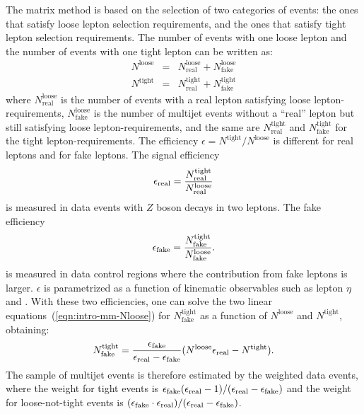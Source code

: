 The matrix method is based on the selection of two categories of
events: the ones that satisfy loose lepton selection requirements, and
the ones that satisfy tight lepton selection requirements.
The number of events with one loose lepton and
the number of events with one tight lepton can be written as:
%                                                                                             
\begin{eqnarray}
  N^\mathrm{loose}
  & = & N^\mathrm{loose}_\mathrm{real}
  + N^{\mathrm{loose}}_\mathrm{fake} \nonumber \\
  N^\mathrm{tight}
  & = & N^\mathrm{tight}_\mathrm{real}
  + N^{\mathrm{tight}}_\mathrm{fake}
  \label{eqn:intro-mm-Nloose}
\end{eqnarray}
%                                                                                             
where $N^\mathrm{loose}_\mathrm{real}$ is the number of events with a
real lepton satisfying loose lepton-requirements,
$N^\mathrm{loose}_\mathrm{fake}$ is the number of multijet events
without a ``real'' lepton but still satisfying loose
lepton-requirements, and the same are $N^\mathrm{tight}_\mathrm{real}$
and $N^\mathrm{tight}_\mathrm{fake}$ for the tight
lepton-requirements. The efficiency
$\epsilon=N^\mathrm{tight}/N^\mathrm{loose}$ is different for real
leptons and for fake leptons. The signal efficiency
%                                                                                             
\begin{equation}
  \epsilon_{\mathrm{real}}{}
  = \frac{N^\mathrm{tight}_\mathrm{real}}{N^\mathrm{loose}_\mathrm{real}}
\end{equation}
is measured in data events with $Z$ boson decays in two leptons.
The fake efficiency
\begin{equation}
  \epsilon_{\mathrm{fake}}{}
  = \frac{N^\mathrm{tight}_\mathrm{fake}}{N^\mathrm{loose}_\mathrm{fake}}.
  \label{eqn:intro-mm-real-fake}
\end{equation}
is measured in data control regions where the contribution from
fake leptons is larger. $\epsilon$ is parametrized as a
function of kinematic observables such as lepton $\eta$ and . With these
two efficiencies, one can solve the two linear
equations~(\ref{eqn:intro-mm-Nloose}) for
$N^{\mathrm{tight}}_\mathrm{fake}$ as a function of $N^\mathrm{loose}$
and $N^\mathrm{tight}$, obtaining:
%                                                                                             
\begin{equation}
  N^\mathrm{tight}_\mathrm{fake}
  = \frac{\epsilon_{\mathrm{fake}}{}}
  {\epsilon_{\mathrm{real}}{} - \epsilon_{\mathrm{fake}}{}}
  (N^\mathrm{loose} \epsilon_{\mathrm{real}}{} - N^\mathrm{tight}).
  \label{eqn:intro-mm-tight_fake}
\end{equation}
%                                                                                             
The sample of multijet events is therefore estimated by the weighted
data events, where the weight for tight events is
$\epsilon_{\mathrm{fake}}{}(\epsilon_{\mathrm{real}}{}-1)/(\epsilon_{\mathrm{real}}{}-\epsilon_{\mathrm{fake}}{})$
and the weight for loose-not-tight events is
$(\epsilon_{\mathrm{fake}}{}\cdot{}\epsilon_{\mathrm{real}}{})/(\epsilon_{\mathrm{real}}{}-\epsilon_{\mathrm{fake}}{})$.

